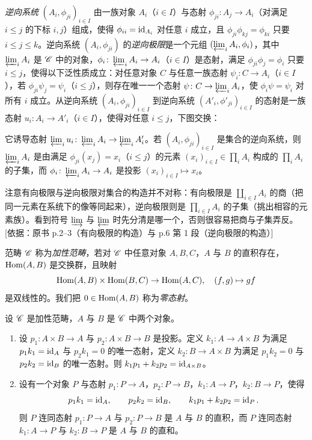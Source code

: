 \emph{逆向系统} $(A_i,\phi_{ji})_{i\in I}$ 由一族对象 $A_i$（$i\in I$）与态射 $\phi_{ji}\colon A_j\to A_i$（对满足 $i\le j$ 的下标 $i,j$）组成，使得 $\phi_{ii}=\operatorname{id}_{A_i}$ 对任意 $i$ 成立，且 $\phi_{ji}\phi_{kj}=\phi_{ki}$ 只要 $i\le j\le k$。逆向系统 $(A_i,\phi_{ji})$ 的\emph{逆向极限}是一个元组 $(\varprojlim_i A_i,\phi_i)$，其中 $\varprojlim_i A_i$ 是 $\mathscr{C}$ 中的对象，$\phi_i\colon\varprojlim_i A_i\to A_i$（$i\in I$）是态射，满足 $\phi_{ji}\phi_j=\phi_i$ 只要 $i\le j$，使得以下泛性质成立：对任意对象 $C$ 与任意一族态射 $\psi_i\colon C\to A_i$（$i\in I$），若 $\phi_{ji}\psi_j=\psi_i$（$i\le j$），则存在唯一一个态射 $\psi\colon C\to\varprojlim_i A_i$，使 $\phi_i\psi=\psi_i$ 对所有 $i$ 成立。从逆向系统 $(A_i,\phi_{ji})_{i\in I}$ 到逆向系统 $(A'_i,\phi'_{ji})_{i\in I}$ 的态射是一族态射 $u_i\colon A_i\to A'_i$（$i\in I$），使得对任意 $i\le j$，下图交换：
\begin{center}
\end{center}
它诱导态射 $\varprojlim_i u_i\colon\varprojlim_i A_i\to\varprojlim_i A'_i$。若 $(A_i,\phi_{ji})_{i\in I}$ 是集合的逆向系统，则 $\varprojlim_i A_i$ 是由满足 $\phi_{ji}(x_j)=x_i$（$i\le j$）的元素 $(x_i)_{i\in I}\in\prod_i A_i$ 构成的 $\prod_i A_i$ 的子集，而 $\phi_i\colon\varprojlim_i A_i\to A_i$ 是投影 $(x_i)_{i\in I}\mapsto x_i$。
\begin{tnote}
注意有向极限与逆向极限对集合的构造并不对称：有向极限是 $\coprod_{i\in I}A_i$ 的商（把同一元素在系统下的像等同起来），逆向极限则是 $\prod_{i\in I}A_i$ 的子集（挑出相容的元素族）。看到符号 $\varinjlim$ 与 $\varprojlim$ 时先分清是哪一个，否则很容易把商与子集弄反。[依据：原书 p.2–3（有向极限的构造）与 p.6 第 1 段（逆向极限的构造）]
\end{tnote}

范畴 $\mathscr{C}$ 称为\emph{加性范畴}，若对 $\mathscr{C}$ 中任意对象 $A,B,C$，$A$ 与 $B$ 的直积存在，$\operatorname{Hom}(A,B)$ 是交换群，且映射
\[
\operatorname{Hom}(A,B)\times\operatorname{Hom}(B,C)\to\operatorname{Hom}(A,C),\quad (f,g)\mapsto gf
\]
是双线性的。我们把 $0\in\operatorname{Hom}(A,B)$ 称为\emph{零态射}。

\begin{proposition}\label{it:1.1.2}
设 $\mathscr{C}$ 是加性范畴，$A$ 与 $B$ 是 $\mathscr{C}$ 中两个对象。
\begin{enumerate}[label=(\roman*),leftmargin=2.8em]
  \item 设 $p_1\colon A\times B\to A$ 与 $p_2\colon A\times B\to B$ 是投影。定义 $k_1\colon A\to A\times B$ 为满足 $p_1k_1=\operatorname{id}_A$ 与 $p_2k_1=0$ 的唯一态射，定义 $k_2\colon B\to A\times B$ 为满足 $p_1k_2=0$ 与 $p_2k_2=\operatorname{id}_B$ 的唯一态射。则 $k_1p_1+k_2p_2=\operatorname{id}_{A\times B}$。
  \item 设有一个对象 $P$ 与态射 $p_1\colon P\to A$，$p_2\colon P\to B$，$k_1\colon A\to P$，$k_2\colon B\to P$，使得
  \[
  p_1k_1=\operatorname{id}_A,\qquad p_2k_2=\operatorname{id}_B,\qquad k_1p_1+k_2p_2=\operatorname{id}_P.
  \]
  则 $P$ 连同态射 $p_1\colon P\to A$ 与 $p_2\colon P\to B$ 是 $A$ 与 $B$ 的直积，而 $P$ 连同态射 $k_1\colon A\to P$ 与 $k_2\colon B\to P$ 是 $A$ 与 $B$ 的直和。
\end{enumerate}
\end{proposition}

